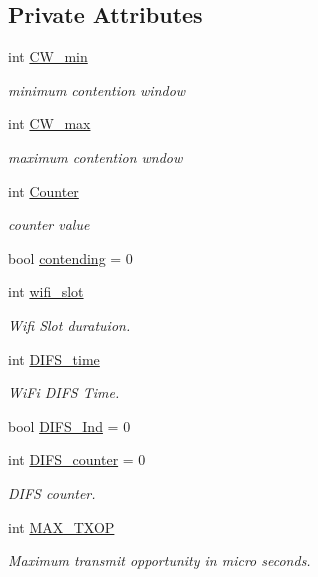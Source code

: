 \subsection*{Private Attributes}
\begin{DoxyCompactItemize}
\item 
int \hyperlink{classSTA_ab466517298fbdaa0efd8532646930dfd}{C\-W\-\_\-min}
\begin{DoxyCompactList}\small\item\em minimum contention window \end{DoxyCompactList}\item 
int \hyperlink{classSTA_ac341bce4f378ac00fd29b69a44b75dee}{C\-W\-\_\-max}
\begin{DoxyCompactList}\small\item\em maximum contention wndow \end{DoxyCompactList}\item 
int \hyperlink{classSTA_ac8a769972c9e523e988f60c75254d215}{Counter}
\begin{DoxyCompactList}\small\item\em counter value \end{DoxyCompactList}\item 
bool \hyperlink{classSTA_ad4226c80ad37062f9648438bce828089}{contending} = 0
\item 
int \hyperlink{classSTA_a376c698ac01f5368b7e218609caa1a5a}{wifi\-\_\-slot}
\begin{DoxyCompactList}\small\item\em Wifi Slot duratuion. \end{DoxyCompactList}\item 
int \hyperlink{classSTA_a156a07b07e16882d60b93571b8e3cd21}{D\-I\-F\-S\-\_\-time}
\begin{DoxyCompactList}\small\item\em Wi\-Fi D\-I\-F\-S Time. \end{DoxyCompactList}\item 
bool \hyperlink{classSTA_a4afbf4650f847e15efbacec896f73f73}{D\-I\-F\-S\-\_\-\-Ind} = 0
\item 
int \hyperlink{classSTA_a94200f37027c90163adc2cee2c502a90}{D\-I\-F\-S\-\_\-counter} = 0
\begin{DoxyCompactList}\small\item\em D\-I\-F\-S counter. \end{DoxyCompactList}\item 
int \hyperlink{classSTA_a285a258f933915b75a6de0460ff6f099}{M\-A\-X\-\_\-\-T\-X\-O\-P}
\begin{DoxyCompactList}\small\item\em Maximum transmit opportunity in micro seconds. \end{DoxyCompactList}\item 

\end{DoxyCompactItemize}
